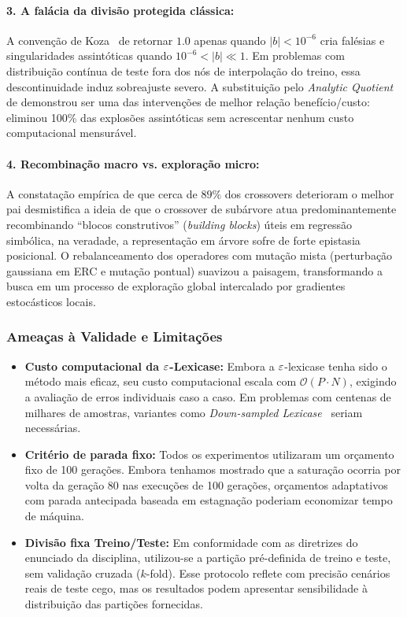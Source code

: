 \paragraph{3. A falácia da divisão protegida clássica:}
A convenção de Koza~\cite{koza1992genetic} de retornar $1.0$ apenas quando
$|b| < 10^{-6}$ cria falésias e singularidades assintóticas quando
$10^{-6} < |b| \ll 1$. Em problemas com distribuição contínua de teste fora
dos nós de interpolação do treino, essa descontinuidade induz sobreajuste
severo. A substituição pelo \emph{Analytic Quotient} de \citet{ni2013analytic}
demonstrou ser uma das intervenções de melhor relação benefício/custo:
eliminou 100\% das explosões assintóticas sem acrescentar nenhum custo
computacional mensurável.

\paragraph{4. Recombinação macro vs. exploração micro:}
A constatação empírica de que cerca de $89\%$ dos crossovers deterioram o
melhor pai desmistifica a ideia de que o crossover de subárvore atua
predominantemente recombinando ``blocos construtivos'' (\emph{building blocks})
úteis em regressão simbólica, na veradade, a representação em árvore sofre de forte
epistasia posicional. O rebalanceamento dos operadores com mutação mista
(perturbação gaussiana em ERC e mutação pontual) suavizou a paisagem,
transformando a busca em um processo de exploração global intercalado por
gradientes estocásticos locais.

\subsubsection{Ameaças à Validade e Limitações}

\begin{itemize}
  \item \textbf{Custo computacional da $\varepsilon$-Lexicase:}
        Embora a $\varepsilon$-lexicase tenha sido o método mais eficaz, seu custo
        computacional escala com $\mathcal{O}(P \cdot N)$, exigindo a
        avaliação de erros individuais caso a caso. Em problemas com centenas
        de milhares de amostras, variantes como \emph{Down-sampled
        Lexicase}~\cite{hernandez2019downsampled} seriam necessárias.
  \item \textbf{Critério de parada fixo:}
        Todos os experimentos utilizaram um orçamento fixo de 100 gerações.
        Embora tenhamos mostrado que a saturação ocorria por volta da geração
        80 nas execuções de 100 gerações, orçamentos adaptativos com parada
        antecipada baseada em estagnação poderiam economizar tempo de máquina.
  \item \textbf{Divisão fixa Treino/Teste:}
        Em conformidade com as diretrizes do enunciado da disciplina,
        utilizou-se a partição pré-definida de treino e teste, sem validação
        cruzada ($k$-fold). Esse protocolo reflete com precisão cenários reais
        de teste cego, mas os resultados podem apresentar sensibilidade à
        distribuição das partições fornecidas.
\end{itemize}
